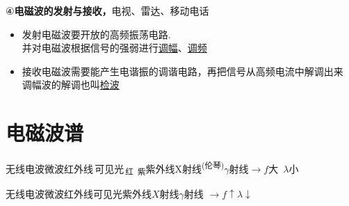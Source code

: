 ④\quad \textbf{电磁波的发射与接收，}\quad 电视、雷达、移动电话
\begin{itemize}
\item 发射电磁波要开放的高频振荡电路.\\ 并对电磁波根据信号的强弱进行\underline{调幅}、\underline{调频} %
\item 接收电磁波需要能产生电谐振的调谐电路，再把信号从高频电流中解调出来\\ 调幅波的解调也叫\underline{检波} %
\end{itemize}


\section{电磁波谱}
\noindent 无线电波\quad 微波\quad 红外线\,可见光\textsubscript{\,红\ 紫}\quad 紫外线\quad X射线\textsuperscript{(伦琴)}\quad $\gamma$射线\quad $\longrightarrow$\quad $f$大\ $\lambda$小 %

无线电波\quad 微波\quad 红外线\quad 可见光\quad 紫外线\quad $X$射线\quad $\gamma$射线 $\longrightarrow$\quad $f\uparrow$\quad $\lambda\downarrow$


